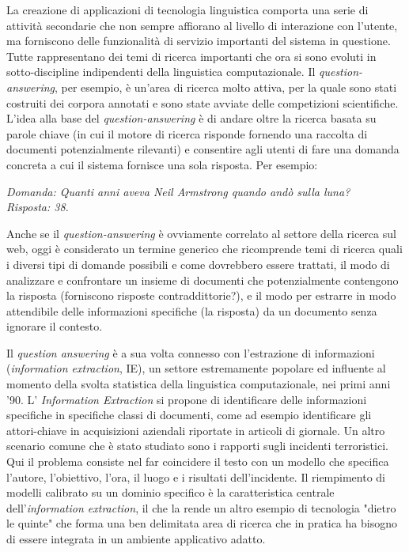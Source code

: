\documentclass[]{../../metanetpaper}
\begin{document}
\begin{multicols}{2}
La creazione di applicazioni di tecnologia linguistica comporta una serie di
attivit\`{a} secondarie che non sempre affiorano al livello di interazione con
l'utente, ma forniscono delle funzionalit\`{a} di servizio importanti del
sistema in questione. Tutte rappresentano dei temi di ricerca importanti che
ora si sono evoluti in sotto-discipline indipendenti della linguistica
computazionale. Il \emph{question-answering}, per esempio, \`{e} un'area di ricerca molto attiva, per la quale sono stati costruiti dei corpora annotati e sono state avviate delle competizioni scientifiche. L'idea alla base del \emph{question-answering} \`{e} di andare oltre la ricerca basata su parole chiave (in cui il motore di ricerca risponde fornendo una raccolta di documenti potenzialmente rilevanti) e consentire agli utenti di fare una domanda concreta a cui il sistema fornisce una sola risposta. Per esempio:



\textit{Domanda: Quanti anni aveva Neil Armstrong quando and\`{o} sulla luna?}\\
\textit{Risposta: 38.}

Anche se il \emph{question-answering} \`{e} ovviamente correlato al settore della ricerca sul web, oggi \`{e} considerato un termine generico che ricomprende temi di ricerca quali i diversi tipi di domande possibili e come dovrebbero essere trattati, il modo di analizzare e confrontare un insieme di documenti che potenzialmente contengono la risposta (forniscono risposte contraddittorie?), e il modo per estrarre in modo attendibile delle informazioni specifiche (la risposta) da un documento senza ignorare il contesto.


Il \emph{question answering} \`{e} a sua volta connesso con l'estrazione di informazioni (\emph{information extraction}, IE), un settore estremamente popolare ed influente al momento della svolta statistica della linguistica computazionale, nei primi anni '90. L' \emph{Information Extraction} si propone di identificare delle informazioni specifiche in specifiche classi di documenti, come ad esempio identificare gli attori-chiave in acquisizioni aziendali riportate in articoli di giornale. Un altro scenario comune che \`{e} stato studiato sono i rapporti sugli incidenti terroristici. Qui il problema consiste nel far coincidere il testo con un modello che specifica l'autore, l'obiettivo, l'ora, il luogo e i risultati dell'incidente. Il riempimento di modelli calibrato su un dominio specifico \`{e} la caratteristica centrale dell'\emph{information extraction}, il che la rende un altro esempio di tecnologia "dietro le quinte" che forma una ben delimitata area di ricerca che in pratica ha bisogno di essere integrata in un ambiente applicativo adatto.


\end{multicols}
\end{document}
